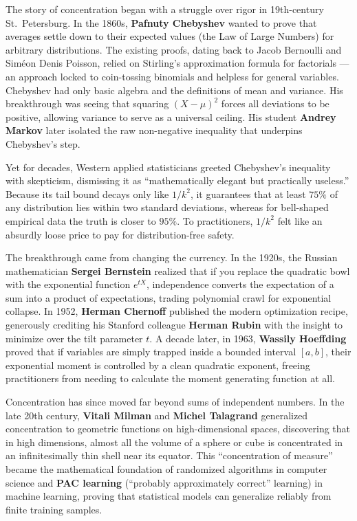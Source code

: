 \begin{historybox}
The story of concentration began with a struggle over rigor in 19th-century
St.\ Petersburg. In the 1860s, \textbf{Pafnuty Chebyshev} wanted to prove that
averages settle down to their expected values (the Law of Large Numbers) for
arbitrary distributions. The existing proofs, dating back to Jacob Bernoulli
and Sim\'eon Denis Poisson, relied on Stirling's approximation formula for
factorials --- an approach locked to coin-tossing binomials and helpless for
general variables. Chebyshev had only basic algebra and the definitions of mean
and variance. His breakthrough was seeing that squaring $(X-\mu)^2$ forces all
deviations to be positive, allowing variance to serve as a universal ceiling.
His student \textbf{Andrey Markov} later isolated the raw non-negative
inequality that underpins Chebyshev's step.

Yet for decades, Western applied statisticians greeted Chebyshev's inequality
with skepticism, dismissing it as ``mathematically elegant but practically
useless.'' Because its tail bound decays only like $1/k^2$, it guarantees that
at least $75\%$ of any distribution lies within two standard deviations,
whereas for bell-shaped empirical data the truth is closer to $95\%$.
To practitioners, $1/k^2$ felt like an absurdly loose price to pay for
distribution-free safety.

The breakthrough came from changing the currency. In the 1920s, the Russian
mathematician \textbf{Sergei Bernstein} realized that if you replace the
quadratic bowl with the exponential function $e^{tX}$, independence converts
the expectation of a sum into a product of expectations, trading polynomial
crawl for exponential collapse. In 1952, \textbf{Herman Chernoff} published the
modern optimization recipe, generously crediting his Stanford colleague
\textbf{Herman Rubin} with the insight to minimize over the tilt parameter $t$.
A decade later, in 1963, \textbf{Wassily Hoeffding} proved that if variables
are simply trapped inside a bounded interval $[a,b]$, their exponential moment
is controlled by a clean quadratic exponent, freeing practitioners from needing
to calculate the moment generating function at all.

Concentration has since moved far beyond sums of independent numbers. In the
late 20th century, \textbf{Vitali Milman} and \textbf{Michel Talagrand}
generalized concentration to geometric functions on high-dimensional spaces,
discovering that in high dimensions, almost all the volume of a sphere or cube
is concentrated in an infinitesimally thin shell near its equator. This
``concentration of measure'' became the mathematical foundation of randomized
algorithms in computer science and \textbf{PAC learning} (``probably
approximately correct'' learning) in machine learning, proving that statistical
models can generalize reliably from finite training samples.


\end{historybox}
